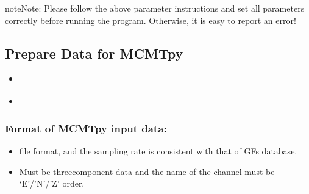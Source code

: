 \documentclass[a4paper,10pt,english,openany]{sphinxmanual}
\begin{document}
\begin{sphinxadmonition}{note}{Note:}
Please follow the above parameter instructions and set all parameters correctly before running the program.
Otherwise, it is easy to report an error!
\end{sphinxadmonition}


\subsection{Prepare Data for MCMTpy}
\label{\detokenize{tutorials/S3_Process_Data:prepare-data-for-mcmtpy}}\label{\detokenize{tutorials/S3_Process_Data::doc}}
\begin{sphinxShadowBox}
\begin{itemize}
\item {} 
\label{\detokenize{tutorials/S3_Process_Data:id1}}{\hyperref[\detokenize{tutorials/S3_Process_Data:format-of-mcmtpy-input-data}]{}}

\item {} 
\label{\detokenize{tutorials/S3_Process_Data:id2}}{\hyperref[\detokenize{tutorials/S3_Process_Data:example}]{}}

\end{itemize}
\end{sphinxShadowBox}


\subsubsection{Format of MCMTpy input data:}
\label{\detokenize{tutorials/S3_Process_Data:format-of-mcmtpy-input-data}}\begin{itemize}
\item {} 
 file format, and the sampling rate  is consistent with that of GFs database.

\item {} 
Must be  three\sphinxhyphen{}component data and the name of the channel must be ‘E’/’N’/’Z’ order.

\end{itemize}
\end{document}
